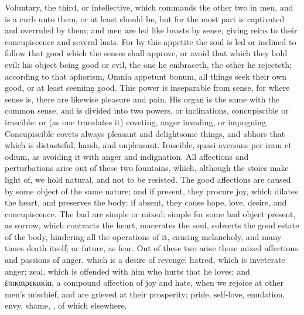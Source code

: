 {Voluntary, the third, or intellective, which commands the other two in
men, and is a curb unto them, or at least should be, but for the most
part is captivated and overruled by them; and men are led like beasts
by sense, giving reins to their concupiscence and several lusts. For by
this appetite the soul is led or inclined to follow that good which the
senses shall approve, or avoid that which they hold evil: his object
being good or evil, the one he embraceth, the other he rejecteth;
according to that aphorism, Omnia appetunt bonum, all things seek their
own good, or at least seeming good. This power is inseparable from
sense, for where sense is, there are likewise pleasure and pain. His
organ is the same with the common sense, and is divided into two
powers, or inclinations, concupiscible or irascible: or (as one 
translates it) coveting, anger invading, or impugning. Concupiscible
covets always pleasant and delightsome things, and abhors that which is
distasteful, harsh, and unpleasant. Irascible, quasi  aversans per
iram et odium, as avoiding it with anger and indignation. All
affections and perturbations arise out of these two fountains, which,
although the stoics make light of, we hold natural, and not to be
resisted. The good affections are caused by some object of the same
nature; and if present, they procure joy, which dilates the heart, and
preserves the body: if absent, they cause hope, love, desire, and
concupiscence. The bad are simple or mixed: simple for some bad object
present, as sorrow, which contracts the heart, macerates the soul,
subverts the good estate of the body, hindering all the operations of
it, causing melancholy, and many times death itself; or future, as
fear. Out of these two arise those mixed affections and passions of
anger, which is a desire of revenge; hatred, which is inveterate anger;
zeal, which is offended with him who hurts that he loves; and
\textgreek{ἐπικαιρεκακία}, a compound affection of joy and hate, when we rejoice at
other men's mischief, and are grieved at their prosperity; pride,
self-love, emulation, envy, shame, \etc{}, of which elsewhere.

}
